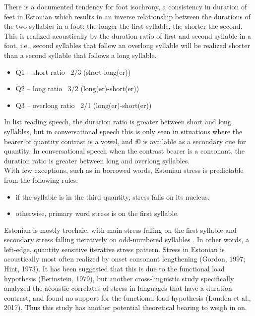 \documentclass[11pt]{article}
\begin{document}
 There is a documented tendency for foot isochrony, a consistency in duration of feet in Estonian which results in an inverse relationship between the durations of the two syllables in a foot: the longer the first syllable, the shorter the second. This is realized acoustically by the duration ratio of first and second syllable in a foot, i.e., second syllables that follow an overlong syllable will be realized shorter than a second syllable that follows a long syllable. \\
 \begin{itemize}
 	\item Q1 – short 		ratio ~2/3	(short-long(er))
	\item Q2 – long		ratio ~3/2	(long(er)-short(er))
	\item Q3 – overlong		ratio ~2/1 	(long(er)-short(er)) 
\end{itemize}
 
  In list reading speech, the duration ratio is greater between short and long syllables, but in conversational speech this is only seen in situations where the bearer of quantity contrast is a vowel, and f0 is available as a secondary cue for quantity. In conversational speech when the contrast bearer is a consonant, the duration ratio is greater between long and overlong syllables. 
 \\

 With few exceptions, such as in borrowed words, Estonian stress is predictable from the following rules:
 \begin{itemize}
 	\item if the syllable is in the third quantity, stress falls on its nucleus. 
	\item otherwise, primary word stress is on the first syllable. 
\end{itemize}
%

Estonian is mostly trochaic, with main stress falling on the first syllable and secondary stress falling iteratively on odd-numbered syllables \cite{lehisteFunctionQuantityFinnish1965}. 
In other words, a left-edge, quantity sensitive iterative stress pattern. Stress in Estonian is acoustically most often realized by onset consonant lengthening (Gordon, 1997; Hint, 1973). It has been suggested that this is due to the functional load hypothesis (Berinstein, 1979), but another cross-linguistic study specifically analyzed the acoustic correlates of stress in languages that have a duration contrast, and found no support for the functional load hypothesis (Lunden et al., 2017). Thus this study has another potential theoretical bearing to weigh in on. 
\end{document}
